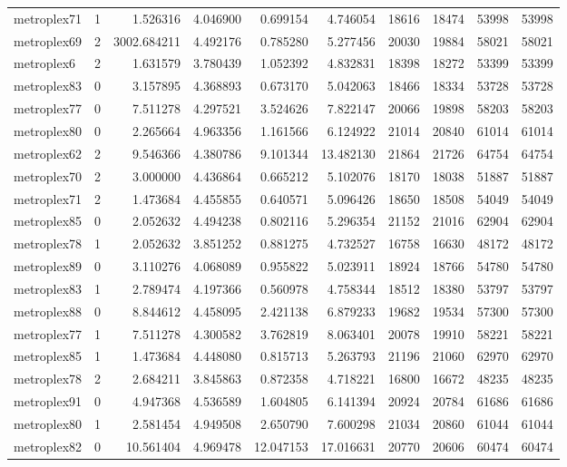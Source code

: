 \begin{longtable}{|l|r|r|r|r|r|r|r|r|r|}
metroplex71 & 1 & 1.526316 & 4.046900 & 0.699154 & 4.746054 & 18616 & 18474 & 53998 & 53998 \\
metroplex69 & 2 & 3002.684211 & 4.492176 & 0.785280 & 5.277456 & 20030 & 19884 & 58021 & 58021 \\
metroplex6 & 2 & 1.631579 & 3.780439 & 1.052392 & 4.832831 & 18398 & 18272 & 53399 & 53399 \\
metroplex83 & 0 & 3.157895 & 4.368893 & 0.673170 & 5.042063 & 18466 & 18334 & 53728 & 53728 \\
metroplex77 & 0 & 7.511278 & 4.297521 & 3.524626 & 7.822147 & 20066 & 19898 & 58203 & 58203 \\
metroplex80 & 0 & 2.265664 & 4.963356 & 1.161566 & 6.124922 & 21014 & 20840 & 61014 & 61014 \\
metroplex62 & 2 & 9.546366 & 4.380786 & 9.101344 & 13.482130 & 21864 & 21726 & 64754 & 64754 \\
metroplex70 & 2 & 3.000000 & 4.436864 & 0.665212 & 5.102076 & 18170 & 18038 & 51887 & 51887 \\
metroplex71 & 2 & 1.473684 & 4.455855 & 0.640571 & 5.096426 & 18650 & 18508 & 54049 & 54049 \\
metroplex85 & 0 & 2.052632 & 4.494238 & 0.802116 & 5.296354 & 21152 & 21016 & 62904 & 62904 \\
metroplex78 & 1 & 2.052632 & 3.851252 & 0.881275 & 4.732527 & 16758 & 16630 & 48172 & 48172 \\
metroplex89 & 0 & 3.110276 & 4.068089 & 0.955822 & 5.023911 & 18924 & 18766 & 54780 & 54780 \\
metroplex83 & 1 & 2.789474 & 4.197366 & 0.560978 & 4.758344 & 18512 & 18380 & 53797 & 53797 \\
metroplex88 & 0 & 8.844612 & 4.458095 & 2.421138 & 6.879233 & 19682 & 19534 & 57300 & 57300 \\
metroplex77 & 1 & 7.511278 & 4.300582 & 3.762819 & 8.063401 & 20078 & 19910 & 58221 & 58221 \\
metroplex85 & 1 & 1.473684 & 4.448080 & 0.815713 & 5.263793 & 21196 & 21060 & 62970 & 62970 \\
metroplex78 & 2 & 2.684211 & 3.845863 & 0.872358 & 4.718221 & 16800 & 16672 & 48235 & 48235 \\
metroplex91 & 0 & 4.947368 & 4.536589 & 1.604805 & 6.141394 & 20924 & 20784 & 61686 & 61686 \\
metroplex80 & 1 & 2.581454 & 4.949508 & 2.650790 & 7.600298 & 21034 & 20860 & 61044 & 61044 \\
metroplex82 & 0 & 10.561404 & 4.969478 & 12.047153 & 17.016631 & 20770 & 20606 & 60474 & 60474 \\

\end{longtable}
